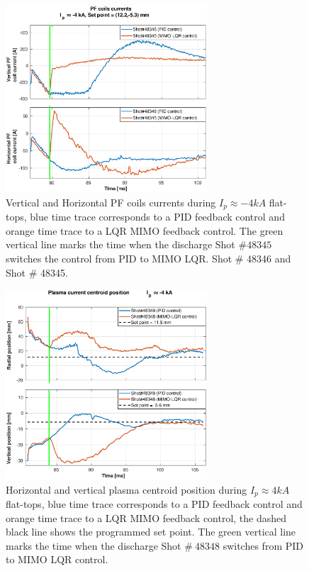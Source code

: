 \begin{figure}
	\centering
	\includegraphics[width=0.67\textwidth]{Chp5/PIDvsMIMO_346_345_curr_2.eps}
	\caption{Vertical and Horizontal PF coils currents during  $I_p\approx -4kA$  flat-tops, blue time trace corresponds to a PID feedback control and orange time trace to a LQR MIMO feedback control. The green vertical line marks the time  when the  discharge Shot $\# 48345$ switches the control from PID to MIMO LQR.  Shot $\#$  48346 and  Shot $\#$ 48345.}
\end{figure}

\begin{figure}
	\centering
	\includegraphics[width=0.67\textwidth]{Chp5/PIDvsMIMO_349_348_2.eps}
	\caption{Horizontal and vertical plasma centroid position during  $I_p\approx 4kA$  flat-tops, blue time trace corresponds to a PID feedback control and orange time trace to a LQR MIMO feedback control, the dashed black line shows the programmed set point. The green vertical line marks the time  when the  discharge Shot $\# ~48348$ switches  from PID to MIMO LQR control.}
\end{figure}

